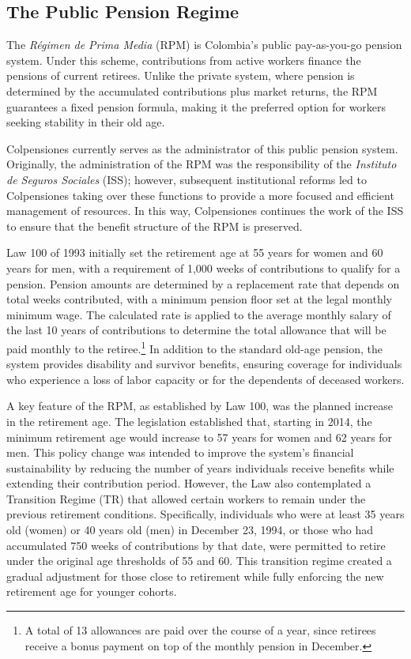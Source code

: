 \documentclass[12pt, a4paper]{article}
\begin{document}
\subsection{The Public Pension Regime}
The \textit{Régimen de Prima Media} (RPM) is Colombia's public pay-as-you-go pension system. Under this scheme, contributions from active workers finance the pensions of current retirees. Unlike the private system, where pension is determined by the accumulated contributions plus market returns, the RPM guarantees a fixed pension formula, making it the preferred option for workers seeking stability in their old age.

Colpensiones currently serves as the administrator of this public pension system. Originally, the administration of the RPM was the responsibility of the \textit{Instituto de Seguros Sociales} (ISS); however, subsequent institutional reforms led to Colpensiones taking over these functions to provide a more focused and efficient management of resources. In this way, Colpensiones continues the work of the ISS to ensure that the benefit structure of the RPM is preserved.

Law 100 of 1993 initially set the retirement age at 55 years for women and 60 years for men, with a requirement of 1,000 weeks of contributions to qualify for a pension. Pension amounts are determined by a replacement rate that depends on total weeks contributed, with a minimum pension floor set at the legal monthly minimum wage. The calculated rate is applied to the average monthly salary of the last 10 years of contributions to determine the total allowance that will be paid monthly to the retiree.\footnote{A total of 13 allowances are paid over the course of a year, since retirees receive a bonus payment on top of the monthly pension in December.} In addition to the standard old-age pension, the system provides disability and survivor benefits, ensuring coverage for individuals who experience a loss of labor capacity or for the dependents of deceased workers.

A key feature of the RPM, as established by Law 100, was the planned increase in the retirement age. The legislation established that, starting in 2014, the minimum retirement age would increase to 57 years for women and 62 years for men. This policy change was intended to improve the system’s financial sustainability by reducing the number of years individuals receive benefits while extending their contribution period. However, the Law also contemplated a Transition Regime (TR) that allowed certain workers to remain under the previous retirement conditions. Specifically, individuals who were at least 35 years old (women) or 40 years old (men) in December 23, 1994, or those who had accumulated 750 weeks of contributions by that date, were permitted to retire under the original age thresholds of 55 and 60. This transition regime created a gradual adjustment for those close to retirement while fully enforcing the new retirement age for younger cohorts.
\end{document}
